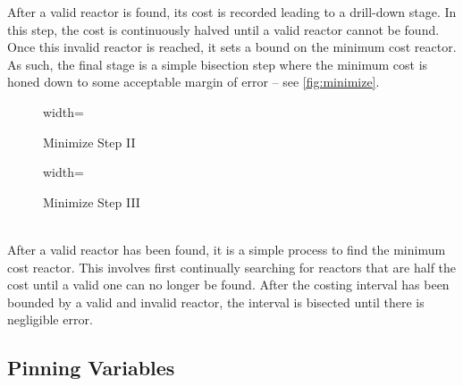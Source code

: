 %	

After a valid reactor is found, its cost is recorded leading to a drill-down stage. In this step, the cost is continuously halved until a valid reactor cannot be found. Once this invalid reactor is reached, it sets a bound on the minimum cost reactor. As such, the final stage is a simple bisection step where the minimum cost is honed down to some acceptable margin of error -- see \cref{fig:minimize}.

\begin{figure*}
    \centering
    \begin{subfigure}[t]{0.725\textwidth}
        \centering
		\begin{adjustbox}{width=\textwidth}
			\Large
			
		\end{adjustbox}
        \caption{ Minimize Step II }
    \end{subfigure}
    \par \bigskip \par \bigskip
    \begin{subfigure}[t]{0.725\textwidth}
        \centering
		\begin{adjustbox}{width=\textwidth}
			\Large
			
		\end{adjustbox}
        \caption{ Minimize Step III }
    \end{subfigure}
    \par \bigskip \par \bigskip
    \caption{Minimize Cost Step II/III -- Optimize Reactor}
    \label{fig:minimize} ~ \\
    \small{ After a valid reactor has been found, it is a simple process to find the minimum cost reactor. This involves first continually searching for reactors that are half the cost until a valid one can no longer be found. After the costing interval has been bounded by a valid and invalid reactor, the interval is bisected until there is negligible error.}
\end{figure*}

\subsection{Pinning  Variables}

